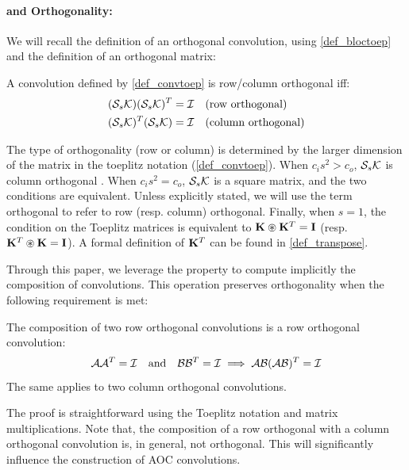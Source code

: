     \paragraph{\Bconv{} and Orthogonality:} We will recall the definition of an orthogonal convolution, using \cref{def_bloctoep} and the definition of an orthogonal matrix:

    \begin{definition}\label{def:orthogonal}  
        A convolution defined by \cref{def_convtoep} is row/column orthogonal iff:
        \begin{align*}
            (\mathcal{S}_{s} \mathcal{K})(\mathcal{S}_{s} \mathcal{K})^T = \mathcal{I} & \quad \text{(row orthogonal)} \\
            (\mathcal{S}_{s} \mathcal{K})^T(\mathcal{S}_{s} \mathcal{K}) = \mathcal{I} & \quad \text{(column orthogonal)}
        \end{align*}
    \end{definition}
        The type of orthogonality (row or column) is determined by the larger dimension of the matrix in the toeplitz notation (\cref{def_convtoep}). When $c_i s^2 > c_o$, $\mathcal{S}_{s} \mathcal{K}$ is column orthogonal \cite{achour2023existencestabilityscalabilityorthogonal}. When $c_i s^2 = c_o$, $\mathcal{S}_{s} \mathcal{K}$ is a square matrix, and the two conditions are equivalent. Unless explicitly stated, we will use the term orthogonal to refer to row (resp. column) orthogonal. Finally, when $s=1$, the condition on the Toeplitz matrices is equivalent to $\mathbf{K} \circledast \mathbf{K}^T = \mathbf{I}$ (resp. $\mathbf{K}^T \circledast \mathbf{K} = \mathbf{I}$). A formal definition of $\mathbf{K}^T$ can be found in  \cref{def_transpose}.
    
    Through this paper, we leverage the \Bconv{} property to compute implicitly the composition of convolutions. This operation preserves orthogonality when the following requirement is met:
    
    \begin{proposition}\label{prop:composition_ortho}  
        The composition of two row orthogonal convolutions is a row orthogonal convolution:
        \[
            \mathcal{A} \mathcal{A}^T = \mathcal{I} \quad \text{and} \quad \mathcal{B} \mathcal{B}^T = \mathcal{I} \implies \mathcal{AB}(\mathcal{AB})^T = \mathcal{I}
        \]
        The same applies to two column orthogonal convolutions.
    \end{proposition}
    The proof is straightforward using the Toeplitz notation and matrix multiplications. Note that, the composition of a row orthogonal with a column orthogonal convolution is, in general, not orthogonal. This will significantly influence the construction of AOC convolutions.


